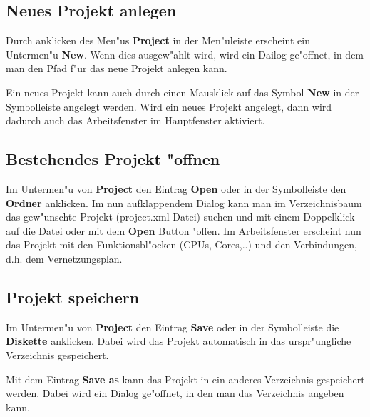 \documentclass[a4paper,titlepage,12pt,ngerman]{scrbook}
\begin{document}
\subsection{Neues Projekt anlegen}
Durch anklicken des Men"us {\bf Project} in der Men"uleiste erscheint ein Untermen"u {\bf New}. Wenn dies ausgew"ahlt wird, wird ein Dailog ge"offnet, in dem man den Pfad f"ur das neue Projekt anlegen kann.\par

Ein neues Projekt kann auch durch einen Mausklick auf das Symbol {\bf New} in der Symbolleiste angelegt werden.
Wird ein neues Projekt angelegt, dann wird dadurch auch das Arbeitsfenster im Hauptfenster aktiviert.


\subsection{Bestehendes Projekt "offnen}
Im Untermen"u von {\bf Project} den Eintrag {\bf Open} oder in der Symbolleiste den {\bf Ordner} anklicken. Im nun aufklappendem Dialog kann man im Verzeichnisbaum das gew"unschte Projekt (project.xml-Datei) suchen und mit einem Doppelklick auf die Datei oder mit dem {\bf Open} Button "offen.
Im Arbeitsfenster erscheint nun das Projekt mit den Funktionsbl"ocken (CPUs, Cores,..) und den Verbindungen, d.h. dem Vernetzungsplan.\par


\subsection{Projekt speichern}
Im Untermen"u von {\bf Project} den Eintrag {\bf Save} oder in der Symbolleiste die {\bf Diskette} anklicken. Dabei wird das Projekt automatisch in das urspr"ungliche Verzeichnis gespeichert.\par
Mit dem Eintrag {\bf Save as} kann das Projekt in ein anderes Verzeichnis gespeichert werden. Dabei wird ein Dialog ge"offnet, in den man das Verzeichnis angeben kann.\par


\end{document}
